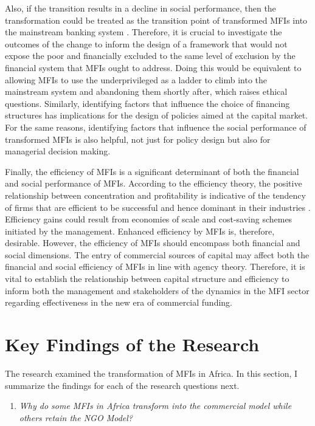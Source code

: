 \documentclass[a4paper, nobind]{templates/ociamthesis}
\providecommand{\tightlist}{%
  \setlength{\itemsep}{0pt}\setlength{\parskip}{0pt}}
\begin{document}
Also, if the transition results in a decline in social performance, then the transformation could be treated as the transition point of transformed MFIs into the mainstream banking system \autocite{kent2013bankers}. Therefore, it is crucial to investigate the outcomes of the change to inform the design of a framework that would not expose the poor and financially excluded to the same level of exclusion by the financial system that MFIs ought to address. Doing this would be equivalent to allowing MFIs to use the underprivileged as a ladder to climb into the mainstream system and abandoning them shortly after, which raises ethical questions. Similarly, identifying factors that influence the choice of financing structures has implications for the design of policies aimed at the capital market. For the same reasons, identifying factors that influence the social performance of transformed MFIs is also helpful, not just for policy design but also for managerial decision making.

Finally, the efficiency of MFIs is a significant determinant of both the financial and social performance of MFIs. According to the efficiency theory, the positive relationship between concentration and profitability is indicative of the tendency of firms that are efficient to be successful and hence dominant in their industries \autocite{lipczynski2005industrial}. Efficiency gains could result from economies of scale and cost-saving schemes initiated by the management. Enhanced efficiency by MFIs is, therefore, desirable. However, the efficiency of MFIs should encompass both financial and social dimensions. The entry of commercial sources of capital may affect both the financial and social efficiency of MFIs in line with agency theory. Therefore, it is vital to establish the relationship between capital structure and efficiency to inform both the management and stakeholders of the dynamics in the MFI sector regarding effectiveness in the new era of commercial funding.

\hypertarget{key-findings-of-the-research}{%
\section{Key Findings of the Research}\label{key-findings-of-the-research}}

The research examined the transformation of MFIs in Africa. In this section, I summarize the findings for each of the research questions next.

\begin{enumerate}
\def\labelenumi{\arabic{enumi}.}
\tightlist
\item
  \emph{Why do some MFIs in Africa transform into the commercial model while others retain the NGO Model?}
\end{enumerate}
\end{document}
